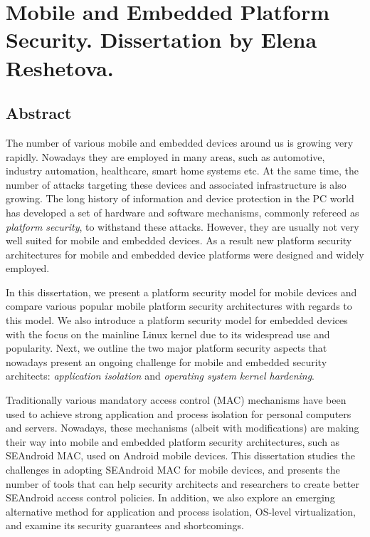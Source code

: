 \chapter*{Mobile and Embedded Platform Security. Dissertation by Elena Reshetova.}


\section*{Abstract}

The number of various mobile and embedded devices around us is growing very rapidly. Nowadays they are employed in many areas, such as automotive, industry automation, healthcare, smart home systems etc. At the same time, the number of attacks targeting these devices and associated infrastructure is also growing. The long history of information and device protection in the PC world has developed a set of hardware and software mechanisms, commonly refereed as \textit{platform security}, to withstand these attacks. However, they are usually not very well suited for mobile and embedded devices. As a result new platform security architectures for mobile and embedded device platforms were designed and widely employed. 

In this dissertation, we present a platform security model for mobile devices and compare various popular mobile platform security architectures with regards to this model. We also introduce a platform security model for embedded devices with the focus on the mainline Linux kernel due to its widespread use and popularity. Next, we outline the two major platform security aspects that nowadays present an ongoing challenge for mobile and embedded security architects: \textit{application isolation} and \textit{operating system kernel hardening}.   

Traditionally various mandatory access control (MAC) mechanisms have been used to achieve strong application and process isolation for personal computers and servers. Nowadays, these mechanisms (albeit with modifications) are making their way into mobile and embedded platform security architectures, such as SEAndroid MAC, used on Android mobile devices. This dissertation studies the challenges in adopting SEAndroid MAC for mobile devices, and presents the number of tools that can help security architects and researchers to create better SEAndroid access control policies. In addition, we also explore an emerging alternative method for application and process isolation, OS-level virtualization, and examine its security guarantees and shortcomings. 

